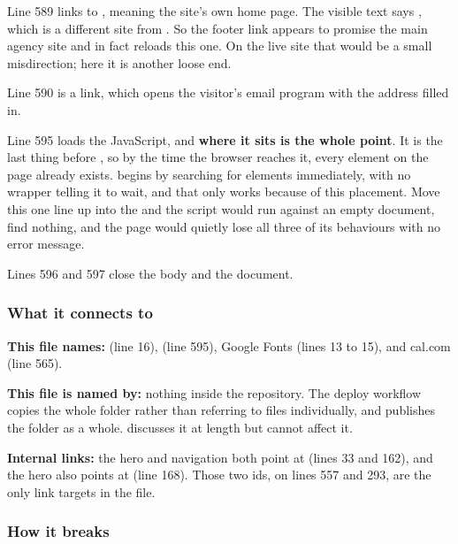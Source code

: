 Line 589 links to \code{/}, meaning the site's own home page. The visible text
says , which is a different site from
. So the footer link appears to promise the main agency
site and in fact reloads this one. On the live site that would be a small
misdirection; here it is another loose end.

Line 590 is a  link, which opens the visitor's email program with
the address filled in.

Line 595 loads the JavaScript, and \textbf{where it sits is the whole point}. It
is the last thing before , so by the time the browser reaches it,
every element on the page already exists.  begins by searching for
elements immediately, with no wrapper telling it to wait, and that only works
because of this placement. Move this one line up into the  and the
script would run against an empty document, find nothing, and the page would
quietly lose all three of its behaviours with no error message.

Lines 596 and 597 close the body and the document.

\subsubsection*{What it connects to}

\textbf{This file names:}  (line 16),
 (line 595), Google Fonts (lines 13 to 15),
and cal.com (line 565).

\textbf{This file is named by:} nothing inside the repository. The deploy workflow
copies the whole folder rather than referring to files individually, and
 publishes the folder as a whole.  discusses it
at length but cannot affect it.

\textbf{Internal links:} the hero and navigation both point at 
(lines 33 and 162), and the hero also points at  (line 168).
Those two ids, on lines 557 and 293, are the only link targets in the file.

\subsubsection*{How it breaks}

